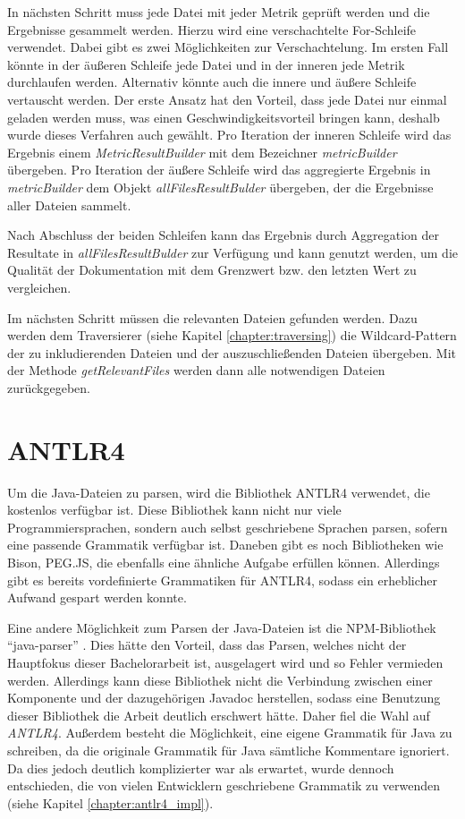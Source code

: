 In nächsten Schritt muss jede Datei mit jeder Metrik geprüft werden und die Ergebnisse gesammelt werden. Hierzu wird eine verschachtelte For-Schleife verwendet. Dabei gibt es zwei Möglichkeiten zur Verschachtelung. Im ersten Fall könnte in der äußeren Schleife jede Datei und in der inneren jede Metrik durchlaufen werden. Alternativ könnte auch die innere und äußere Schleife vertauscht werden. Der erste Ansatz hat den Vorteil, dass jede Datei nur einmal geladen werden muss, was einen Geschwindigkeitsvorteil bringen kann, deshalb wurde dieses Verfahren auch gewählt. Pro Iteration der inneren Schleife  wird das Ergebnis einem \textit{MetricResultBuilder} mit dem Bezeichner \textit{metricBuilder}  übergeben. Pro Iteration der äußere Schleife wird das aggregierte Ergebnis in \textit{metricBuilder} dem Objekt \textit{allFilesResultBulder} übergeben, der die Ergebnisse aller Dateien sammelt. 

Nach Abschluss der beiden Schleifen kann das Ergebnis durch Aggregation der Resultate in \textit{allFilesResultBulder} zur Verfügung und kann genutzt werden, um die Qualität der Dokumentation mit dem Grenzwert bzw. den letzten Wert zu vergleichen. 

Im nächsten Schritt müssen die relevanten Dateien gefunden werden. Dazu werden dem Traversierer (siehe Kapitel \ref{chapter:traversing}) die Wildcard-Pattern der zu inkludierenden Dateien und der auszuschließenden Dateien übergeben. Mit der Methode \textit{getRelevantFiles} werden dann alle notwendigen Dateien zurückgegeben.
\section{ANTLR4}
Um die Java-Dateien zu parsen, wird die Bibliothek ANTLR4 \cite{ANTLR} verwendet, die kostenlos verfügbar ist. Diese Bibliothek kann nicht nur viele Programmiersprachen, sondern auch selbst geschriebene Sprachen parsen, sofern eine passende Grammatik verfügbar ist. Daneben gibt es noch Bibliotheken wie Bison, PEG.JS, die ebenfalls eine ähnliche Aufgabe erfüllen können. Allerdings gibt es bereits vordefinierte Grammatiken für ANTLR4, sodass ein erheblicher Aufwand gespart werden konnte.  

Eine andere Möglichkeit zum Parsen der Java-Dateien ist die NPM-Bibliothek \enquote{java-parser} \cite{Java-parser}. Dies hätte den Vorteil, dass das Parsen, welches nicht der Hauptfokus dieser Bachelorarbeit ist, ausgelagert wird und so Fehler vermieden werden. Allerdings kann diese Bibliothek nicht die Verbindung zwischen einer Komponente und der dazugehörigen Javadoc herstellen, sodass eine Benutzung dieser Bibliothek die Arbeit deutlich erschwert hätte. Daher fiel die Wahl auf \textit{ANTLR4}. Außerdem besteht die Möglichkeit, eine eigene Grammatik für Java zu schreiben, da die originale Grammatik für Java sämtliche Kommentare ignoriert. Da dies jedoch deutlich komplizierter war als erwartet, wurde dennoch entschieden, die von vielen Entwicklern geschriebene Grammatik zu verwenden (siehe Kapitel \ref{chapter:antlr4_impl}).

